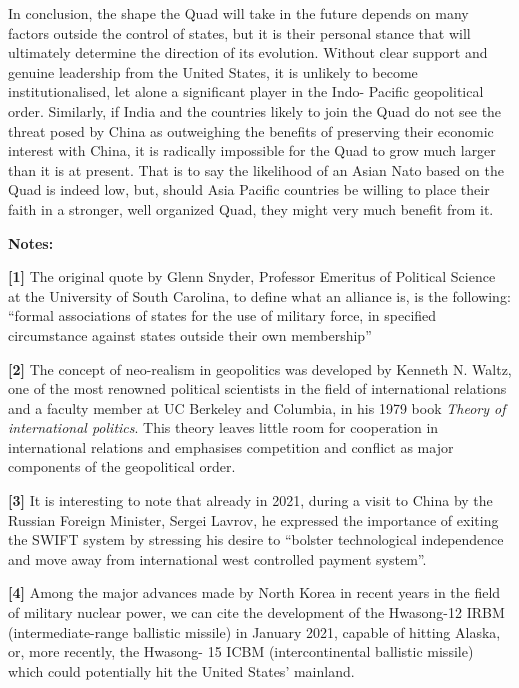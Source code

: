 \documentclass[11pt,a4paper]{article}
\begin{document}
In conclusion, the shape the Quad will take in the future depends on many factors outside the control of states, but it is their personal stance that will ultimately determine the direction of its evolution. Without clear support and genuine leadership from the United States, it is unlikely to become institutionalised, let alone a significant player in the Indo- Pacific geopolitical order. Similarly, if India and the countries likely to join the Quad do not see the threat posed by China as outweighing the benefits of preserving their economic interest with China, it is radically impossible for the Quad to grow much larger than it is at present. That is to say the likelihood of an Asian Nato based on the Quad is indeed low, but, should Asia Pacific countries be willing to place their faith in a stronger, well organized Quad, they might very much benefit from it.

\textbf{Notes:}

\textbf{{[}1{]}} The original quote by Glenn Snyder, Professor Emeritus of Political Science at the University of South Carolina, to define what an alliance is, is the following: “formal associations of states for the use of military force, in specified circumstance against states outside their own membership”

\textbf{{[}2{]}} The concept of neo-realism in geopolitics was developed by Kenneth N. Waltz, one of the most renowned political scientists in the field of international relations and a faculty member at UC Berkeley and Columbia, in his 1979 book \emph{Theory of international politics}. This theory leaves little room for cooperation in international relations and emphasises competition and conflict as major components of the geopolitical order.

\textbf{{[}3{]}} It is interesting to note that already in 2021, during a visit to China by the Russian Foreign Minister, Sergei Lavrov, he expressed the importance of exiting the SWIFT system by stressing his desire to “bolster technological independence and move away from international west controlled payment system”.

\textbf{{[}4{]}} Among the major advances made by North Korea in recent years in the field of military nuclear power, we can cite the development of the Hwasong-12 IRBM (intermediate-range ballistic missile) in January 2021, capable of hitting Alaska, or, more recently, the Hwasong- 15 ICBM (intercontinental ballistic missile) which could potentially hit the United States’ mainland.
\end{document}
